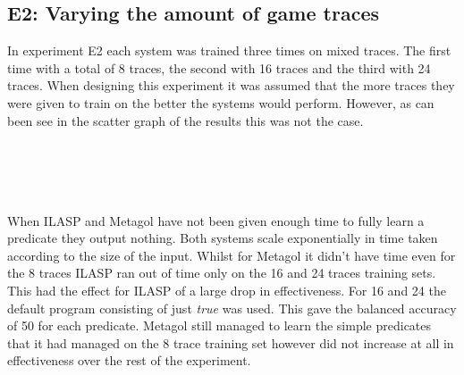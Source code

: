 \subsection{E2: Varying the amount of game traces}
In experiment E2 each system was trained three times on mixed traces. The first time with a total of 8 traces, the second with 16 traces and the third with 24 traces. When designing this experiment it was assumed that the more traces they were given to train on the better the systems would perform. However, as can been see in the scatter graph of the results this was not the case.
\\\\\\
\\\\
When ILASP and Metagol have not been given enough time to fully learn a predicate they output nothing. Both systems scale exponentially in time taken according to the size of the input. Whilst for Metagol it didn't have time even for the 8 traces ILASP ran out of time only on the 16 and 24 traces training sets. This had the effect for ILASP of a large drop in effectiveness. For 16 and 24 the default program consisting of just \textit{true} was used. This gave the balanced accuracy of 50 for each predicate. Metagol still managed to learn the simple predicates that it had managed on the 8 trace training set however did not increase at all in effectiveness over the rest of the experiment.

